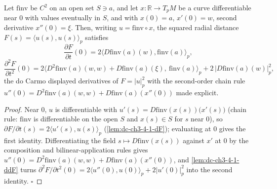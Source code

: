 \begin{lemma}
  \label{lem:dc-ch3-4-1-fidentity}
  \leanok
  Let $\mathrm{finv}$ be $C^2$ on an open set $S\ni a$, and let $x:\mathbb R\to T_pM$ be a
  curve differentiable near $0$ with values eventually in $S$, and with $x(0)=a$, $x'(0)=w$,
  second derivative $x''(0)=\xi$. Then, writing $u=\mathrm{finv}\circ x$, the squared radial
  distance $F(s)=\langle u(s),u(s)\rangle_p$ satisfies
  $$\frac{\partial F}{\partial t}(0)=2\langle D\mathrm{finv}(a)(w),\mathrm{finv}(a)\rangle_p,$$
  $$\frac{\partial^2 F}{\partial t^2}(0)
    =2\big\langle D^2\mathrm{finv}(a)(w,w)+D\mathrm{finv}(a)(\xi),\ \mathrm{finv}(a)\big\rangle_p
      +2\,\big|D\mathrm{finv}(a)(w)\big|_p^2,$$
  the do Carmo displayed derivatives of $F=|u|_p^2$ with the second-order chain rule
  $u''(0)=D^2\mathrm{finv}(a)(w,w)+D\mathrm{finv}(a)(x''(0))$ made explicit.
\end{lemma}
\begin{proof}
  \leanok
  Near $0$, $u$ is differentiable with $u'(s)=D\mathrm{finv}(x(s))\big(x'(s)\big)$ (chain rule:
  $\mathrm{finv}$ is differentiable on the open $S$ and $x(s)\in S$ for $s$ near $0$), so
  $\partial F/\partial t(s)=2\langle u'(s),u(s)\rangle_p$ (\cref{lem:dc-ch3-4-1-dF}); evaluating
  at $0$ gives the first identity. Differentiating the field $s\mapsto D\mathrm{finv}(x(s))$
  against $x'$ at $0$ by the composition and bilinear-application rules gives
  $u''(0)=D^2\mathrm{finv}(a)(w,w)+D\mathrm{finv}(a)(x''(0))$, and \cref{lem:dc-ch3-4-1-ddF}
  turns $\partial^2 F/\partial t^2(0)=2\langle u''(0),u(0)\rangle_p+2|u'(0)|_p^2$ into the
  second identity. $\square$
\end{proof}

